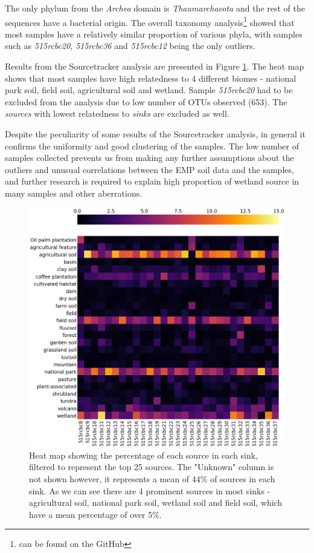 \documentclass[12pt,twocolumn]{article} %
\begin{document}
\par
The only phylum from the \textit{Archea} domain is \textit{Thaumarchaeota} and the rest of the sequences have a bacterial origin. The overall taxonomy analysis\footnote{can be found on the GitHub\cite{Anonymous2018}} showed that most samples have a relatively similar proportion of various phyla, with samples such as \textit{515rcbc20}, \textit{515rcbc36} and \textit{515rcbc12} being the only outliers.
\par
Results from the Sourcetracker analysis are presented in Figure \ref{fig:Sourcetracker_heatmap}. The heat map shows that most samples have high relatedness to 4 different biomes - national park soil, field soil, agricultural soil and wetland. Sample \textit{515rcbc20} had to be excluded from the analysis due to low number of OTUs observed (653). The \textit{sources} with lowest relatedness to \textit{sinks} are excluded as well. 
\par
Despite the peculiarity of some results of the Sourcetracker analysis, in general it confirms the uniformity and good clustering of the samples. The low number of samples collected prevents us from making any further assumptions about the outliers and unusual correlations between the EMP soil data and the samples, and further research is required to explain high proportion of wetland source in many samples and other aberrations.
\begin{figure}[ht!] %
	\includegraphics[width=\linewidth]{heatmap_perc.png}
	\caption{Heat map showing the percentage of each source in each sink, filtered to represent the top 25 sources. The "Unknown" column is not shown however, it represents a mean of 44\% of sources in each sink. As we can see there are 4 prominent sources in most sinks - agricultural soil, national park soil, wetland soil and field soil, which have a mean percentage of over 5\%.}
	\label{fig:Sourcetracker_heatmap}
\end{figure}
%
%
\end{document}
